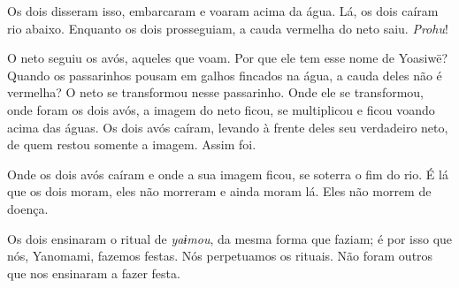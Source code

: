 Os dois disseram isso, embarcaram e voaram acima da água. Lá, os dois
caíram rio abaixo. Enquanto os dois prosseguiam, a cauda vermelha do
neto saiu. \emph{Prohu}! 

O neto seguiu os avós, aqueles que voam. Por que ele tem esse nome de
Yoasiwë? Quando os passarinhos pousam em galhos fincados na água, a
cauda deles não é vermelha? O neto se transformou nesse passarinho. Onde
ele se transformou, onde foram os dois avós, a imagem do neto ficou, se
multiplicou e ficou voando acima das águas. Os dois avós caíram, levando
à frente deles seu verdadeiro neto, de quem restou somente a imagem.
Assim foi. 

Onde os dois avós caíram e onde a sua imagem ficou, se soterra o fim do
rio. É lá que os dois moram, eles não morreram e ainda moram lá. Eles
não morrem de doença. 

Os dois ensinaram o ritual de \emph{yaɨmou}, da mesma forma que faziam;
é por isso que nós, Yanomami, fazemos festas. Nós perpetuamos os
rituais. Não foram outros que nos ensinaram a fazer festa. 

 
